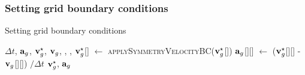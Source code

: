 \subsubsection{Setting grid boundary conditions}
\begin{breakablealgorithm}
  \caption{Setting grid boundary conditions}
  \begin{algorithmic}[1]
    \Require $\Delta t$, $\mathbf{a}_g$, $\mathbf{v}_g^{\star}$, $\mathbf{v}_g$,
             , ,
        \State $\mathbf{v}_g^\star$[\TTmatl] $\leftarrow$ \textsc{applySymmetryVelocityBC}($\mathbf{v}_g^\star$[\TTmatl])
          \State $\mathbf{a}_g$[\TTmatl][\TTnode] $\leftarrow$ ($\mathbf{v}_g^\star$[\TTmatl][\TTnode] - $\mathbf{v}_g$[\TTmatl][\TTnode]) $/ \Delta t$
        \EndFor
      \EndFor
      \State \Return $\mathbf{v}_g^\star$, $\mathbf{a}_g$
    \EndProcedure
  \end{algorithmic}
\end{breakablealgorithm}

